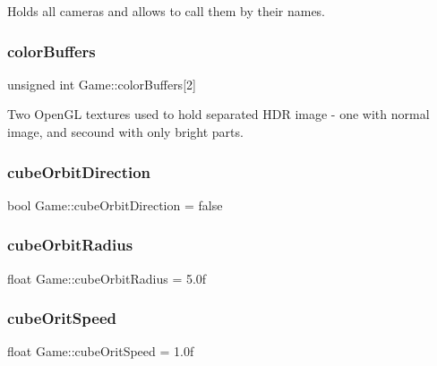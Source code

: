 Holds all cameras and allows to call them by their names. 

\mbox{\label{class_game_af6b4374237efc5ae2586dd1b2a0304f3}} 
\subsubsection{\texorpdfstring{colorBuffers}{colorBuffers}}
{\footnotesize\ttfamily unsigned int Game\+::color\+Buffers\mbox{[}2\mbox{]}\hspace{0.3cm}{\ttfamily [protected]}}



Two Open\+GL textures used to hold separated H\+DR image -\/ one with normal image, and secound with only bright parts. 

\mbox{\label{class_game_a5f78e2edc6fead54dac8acd2f0126d87}} 
\subsubsection{\texorpdfstring{cubeOrbitDirection}{cubeOrbitDirection}}
{\footnotesize\ttfamily bool Game\+::cube\+Orbit\+Direction = false}

\mbox{\label{class_game_a2b87cb2d287ad76c001515f10de5a257}} 
\subsubsection{\texorpdfstring{cubeOrbitRadius}{cubeOrbitRadius}}
{\footnotesize\ttfamily float Game\+::cube\+Orbit\+Radius = 5.\+0f}

\mbox{\label{class_game_ab28799b678dfa0b4813d101931a59b1d}} 
\subsubsection{\texorpdfstring{cubeOritSpeed}{cubeOritSpeed}}
{\footnotesize\ttfamily float Game\+::cube\+Orit\+Speed = 1.\+0f}


